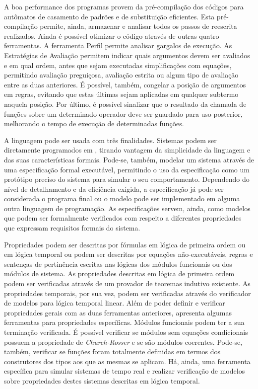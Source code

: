 A boa performance dos programas \Maude provem da pré-compilação dos códigos para autômatos de casamento de padrões e de substituição eficientes.
Esta pré-compilação permite, ainda, armazenar e analisar todos os passos de reescrita realizados.
Ainda é possível otimizar o código através de outras quatro ferramentas.
A ferramenta Perfil permite analisar gargalos de execução.
As Estratégias de Avaliação permitem indicar quais argumentos devem ser avaliados e em qual ordem, antes que sejam executadas simplificações com equações, permitindo avaliação preguiçosa, avaliação estrita ou algum tipo de avaliação entre as duas anteriores.
É possível, também, congelar a posição de argumentos em regras, evitando que estas últimas sejam aplicadas em qualquer subtermo naquela posição.
Por último, é possível sinalizar que o resultado da chamada de funções sobre um determinado operador deve ser guardado para uso posterior, melhorando o tempo de execução de determinadas funções.

A linguagem \Maude pode ser usada com três finalidades.
Sistemas podem ser diretamente programados em \Maude, tirando vantagem da simplicidade da linguagem e das suas características formais.
Pode-se, também, modelar um sistema através de uma especificação formal executável, permitindo o uso da especificação como um protótipo preciso do sistema para simular o seu comportamento.
Dependendo do nível de detalhamento e da eficiência exigida, a especificação já pode ser considerada o programa final ou o modelo pode ser implementado em alguma outra linguagem de programação.
As especificações servem, ainda, como modelos que podem ser formalmente verificados com respeito a diferentes propriedades que expressam requisitos formais do sistema.

Propriedades podem ser descritas por fórmulas em lógica de primeira ordem ou em lógica temporal ou podem ser descritas por equações não-executáveis, regras e sentenças de pertinência escritas nas lógicas dos módulos funcionais ou dos módulos de sistema.
As propriedades descritas em lógica de primeira ordem podem ser verificadas através de um provador de teoremas indutivo existente.
As propriedades temporais, por sua vez, podem ser verificadas através do verificador de modelos para lógica temporal linear.
Além de poder definir e verificar propriedades gerais com as duas ferramentas anteriores, \Maude apresenta algumas ferramentas para propriedades específicas.
Módulos funcionais podem ter a sua terminação verificada.
É possível verificar se módulos sem equações condicionais possuem a propriedade de \textit{Church-Rosser} e se são módulos coerentes.
Pode-se, também, verificar se funções foram totalmente definidas em termos dos construtores dos tipos aos que as mesmas se aplicam.
Há, ainda, uma ferramenta específica para simular sistemas de tempo real e realizar verificação de modelos sobre propriedades destes sistemas descritas em lógica temporal.

